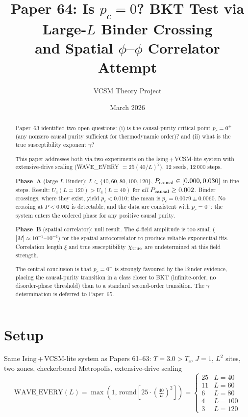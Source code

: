 \documentclass[12pt,a4paper]{article}
\title{\textbf{Paper 64: Is $p_c = 0$? BKT Test via Large-$L$ Binder Crossing\\
\large and Spatial $\phi$--$\phi$ Correlator Attempt}}
\author{VCSM Theory Project}
\date{March 2026}
\begin{document}
\maketitle

\begin{abstract}
Paper~63 identified two open questions:
(i) is the causal-purity critical point $p_c = 0^+$
(any nonzero causal purity sufficient for thermodynamic order)?
and (ii) what is the true susceptibility exponent $\gamma$?

This paper addresses both via two experiments on the Ising\,+\,VCSM-lite system
with extensive-drive scaling (WAVE\_EVERY $= 25(40/L)^2$), 12 seeds, 12\,000 steps.

\textbf{Phase~A} (large-$L$ Binder): $L \in \{40,60,80,100,120\}$,
$P_{\rm causal} \in [0.000, 0.030]$ in fine steps.
Result: $U_4(L=120) > U_4(L=40)$ for \emph{all} $P_{\rm causal} \geq 0.002$.
Binder crossings, where they exist, yield $p_c < 0.010$;
the mean is $p_c = 0.0079 \pm 0.0060$.
No crossing at $P < 0.002$ is detectable, and the data are consistent with $p_c = 0^+$:
the system enters the ordered phase for any positive causal purity.

\textbf{Phase~B} (spatial correlator): null result.
The $\phi$-field amplitude is too small
($|\bar{M}| \approx 10^{-3}$--$10^{-4}$) for the spatial autocorrelator
to produce reliable exponential fits.
Correlation length $\xi$ and true susceptibility $\chi_{\rm true}$ are
undetermined at this field strength.

The central conclusion is that $p_c = 0^+$ is strongly favoured by the
Binder evidence, placing the causal-purity transition in a class closer to
BKT (infinite-order, no disorder-phase threshold) than to a standard
second-order transition.
The $\gamma$ determination is deferred to Paper~65.
\end{abstract}

\section{Setup}

Same Ising\,+\,VCSM-lite system as Papers 61--63:
$T = 3.0 > T_c$, $J = 1$, $L^2$ sites, two zones,
checkerboard Metropolis, extensive-drive scaling
\begin{equation}
\text{WAVE\_EVERY}(L) = \max\!\left(1,\,
  \text{round}\!\left[25 \cdot \left(\tfrac{40}{L}\right)^2\right]\right)
=
\begin{cases}
25 & L = 40 \\
11 & L = 60 \\
6  & L = 80 \\
4  & L = 100 \\
3  & L = 120
\end{cases}
\end{equation}
\end{document}
